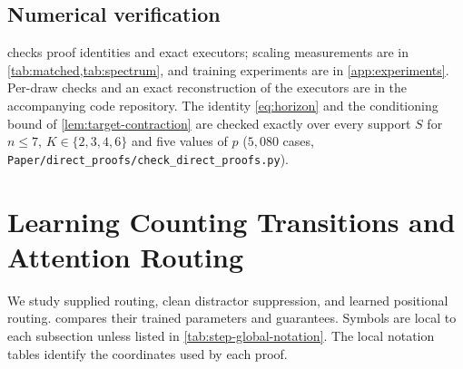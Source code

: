 \subsection{Numerical verification}
\label{app:verify}
 checks proof identities and exact executors; scaling measurements are in \cref{tab:matched,tab:spectrum},
and training experiments are in \cref{app:experiments}. Per-draw checks and an exact reconstruction of the executors are in the accompanying code repository. The identity
\cref{eq:horizon} and the conditioning bound of \cref{lem:target-contraction} are checked exactly over every support $S$ for $n\le7$,
$K\in\{2,3,4,6\}$ and five values of $p$ ($5{,}080$ cases, \texttt{Paper/direct\_proofs/check\_direct\_proofs.py}).

\begin{table}[htbp]
\centering\small
{}
\caption{\textbf{Checks of proof identities and exact executors.} The leading-coefficient check uses a two-block Transformer at width
$16$, $K=2$, with (A2), float64 and exact averaging over all words; the direction $\tilde{\bm\theta}$ is structured and
$\initscale\in\{0.02,0.05\}$. The executor check uses width $2{,}029$ on $532$ prompts.
Gradient and degree scaling measurements are in \cref{tab:matched,tab:spectrum}.}
\label{tab:verify}
\end{table}

\section{Learning Counting Transitions and Attention Routing}
\label{app:joint}

We study supplied routing, clean distractor suppression, and learned positional routing.
 compares their trained parameters and guarantees.
Symbols are local to each subsection unless listed in \cref{tab:step-global-notation}.
The local notation tables identify the coordinates used by each proof.

